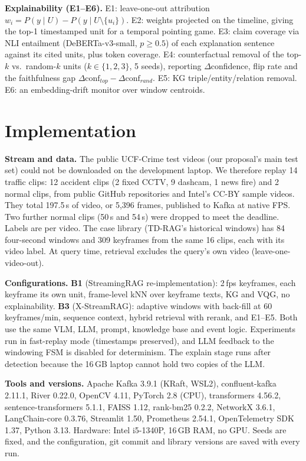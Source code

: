 \documentclass[conference]{IEEEtran}
\begin{document}
\textbf{Explainability (E1--E6).}
E1: leave-one-out attribution $w_i=P(y\mid U)-P(y\mid U\setminus\{u_i\})$.
E2: weights projected on the timeline, giving the top-1 timestamped unit for a temporal pointing game.
E3: claim coverage via NLI entailment (DeBERTa-v3-small, $p\ge0.5$) of each explanation sentence against
its cited units, plus token coverage.
E4: counterfactual removal of the top-$k$ vs.\ random-$k$ units ($k\in\{1,2,3\}$, 5 seeds), reporting
$\Delta$confidence, flip rate and the faithfulness gap $\Delta\text{conf}_{top}-\Delta\text{conf}_{rand}$.
E5: KG triple/entity/relation removal.
E6: an embedding-drift monitor over window centroids.

\section{Implementation}
\textbf{Stream and data.} The public UCF-Crime test videos (our proposal's main test set) could not be
downloaded on the development laptop. We therefore replay 14 traffic clips: 12 accident clips (2 fixed
CCTV, 9 dashcam, 1 news fire) and 2 normal clips, from public GitHub repositories and Intel's CC-BY sample
videos. They total 197.5\,s of video, or 5,396 frames, published to Kafka at native FPS. Two
further normal clips (50\,s and 54\,s) were dropped to meet the deadline. Labels are per video. The case
library (TD-RAG's historical windows) has 84 four-second windows and 309 keyframes from the same 16 clips,
each with its video label. At query time, retrieval excludes the query's own video (leave-one-video-out).

\textbf{Configurations.} \textbf{B1} (StreamingRAG re-implementation): 2\,fps keyframes, each keyframe
its own unit, frame-level kNN over keyframe texts, KG and VQG, no explainability. \textbf{B3}
(X-StreamRAG): adaptive windows with back-fill at 60 keyframes/min, sequence context, hybrid retrieval with
rerank, and E1--E5. Both use the same VLM, LLM, prompt, knowledge base and event logic. Experiments run in
fast-replay mode (timestamps preserved), and LLM feedback to the windowing FSM is disabled for
determinism. The explain stage runs after detection because the 16\,GB laptop cannot hold two copies of the
LLM.

\textbf{Tools and versions.} Apache Kafka 3.9.1 (KRaft, WSL2), confluent-kafka 2.11.1, River 0.22.0,
OpenCV 4.11, PyTorch 2.8 (CPU), transformers 4.56.2, sentence-transformers 5.1.1, FAISS 1.12, rank-bm25
0.2.2, NetworkX 3.6.1, LangChain-core 0.3.76, Streamlit 1.50, Prometheus 2.54.1, OpenTelemetry SDK 1.37,
Python 3.13. Hardware: Intel i5-1340P, 16\,GB RAM, no GPU. Seeds are fixed, and the configuration, git
commit and library versions are saved with every run.
\end{document}
